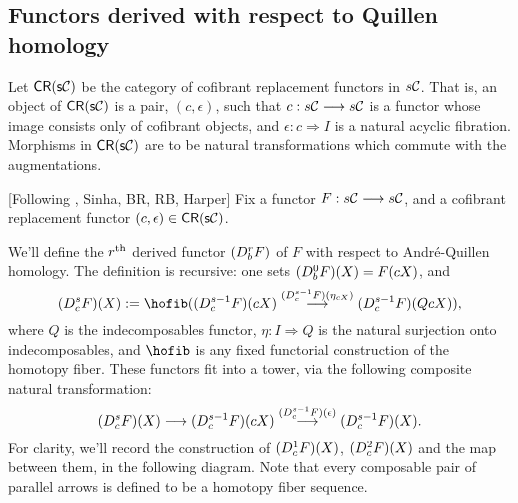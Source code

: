 \documentclass[10pt]{article}
\newcommand{\Comm}{\calC}
\begin{document}
\begin{convergence}
\newcommand{\dupdown}[2]{D^{\smash{#1}}_{\smash{#2}}}
\newcommand{\caldup}[1]{\calD^{\smash{#1}}}
\newcommand{\caldupdown}[2]{\calD^{\smash{#1}}_{\smash{#2}}}
\subsection{Functors derived with respect to Quillen homology}
Let $\mathsf{CR(s\Comm)}$ be the category of cofibrant replacement functors in $s\Comm$. That is, an object of $\mathsf{CR(s\Comm)}$ is a pair, $(c,\epsilon)$, such that $c:s\Comm\to s\Comm$ is a functor whose image consists only of cofibrant objects, and $\epsilon:c\Rightarrow I$ is a natural acyclic fibration. Morphisms in $\mathsf{CR(s\Comm)}$ are to be natural transformations which commute with the augmentations.

[Following \cite{BousKanSSeq.pdf}, Sinha, BR, RB, Harper] Fix a functor $F:s\Comm\to s\Comm$, and a cofibrant replacement functor $(c,\epsilon)\in\mathsf{CR(s\Comm)}$.

We'll define the $r^\textup{th}$ derived functor $(\dupdown{r}{b}F)$ of $F$ with respect to Andr\'e-Quillen homology. The definition is recursive: one sets $(\dupdown{0}{b}F)(X)=F(cX)$, and
\[(\dupdown{s}{c}F)(X):=\hofib((\dupdown{s-1}{c}F)(cX)\overset{(\dupdown{s-1}{c}F)(\eta_{cX})}{\to} (\dupdown{s-1}{c}F)(QcX)),\]
where $Q$ is the indecomposables functor, $\eta:I\Rightarrow Q$ is the natural surjection onto indecomposables, and $\hofib$ is any fixed  functorial construction of the homotopy fiber. These functors fit into a tower, via the following composite natural transformation:
\[(\dupdown{s}{c}F)(X)\to (\dupdown{s-1}{c}F)(cX)\overset{(\dupdown{s-1}{c}F)(\epsilon)}{\to} (\dupdown{s-1}{c}F)(X).\]
For clarity, we'll record the construction of $(\dupdown{1}{c}F)(X)$, $(\dupdown{2}{c}F)(X)$ and the map between them, in the following diagram. Note that every composable pair of  parallel arrows is defined to be a homotopy fiber sequence.



\end{convergence}
\end{document}
